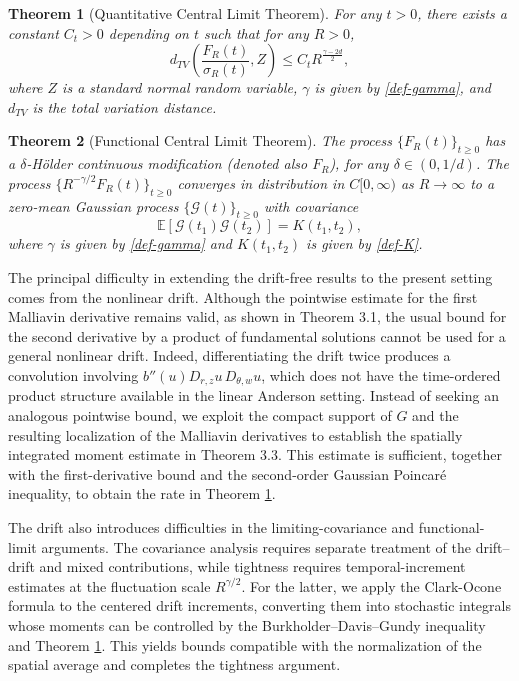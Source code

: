 \documentclass[12pt]{article}
\newtheorem{theorem}{Theorem}[section]
\def\cG{\mathcal{G}}
\def\bE{\mathbb{E}}
\def\bR{\mathbb{R}}
\begin{document}
\begin{theorem}[Quantitative Central Limit Theorem]
\label{QCLT}
For any $t>0$, there exists a constant $C_t>0$ depending on $t$ such that for any $R>0$,
\[
d_{TV}\left( \frac{F_R(t)}{\sigma_R(t)},Z\right) \leq C_t R^{\frac{\gamma-2d}{2}},
\]
where $Z$ is a standard normal random variable, $\gamma$ is given by \eqref{def-gamma}, and $d_{TV}$ is the total variation distance.
\end{theorem}


\begin{theorem}[Functional Central Limit Theorem]
\label{FCLT}
The process $\{F_R(t)\}_{t\geq 0}$ has a $\delta$-H\"older continuous modification (denoted also $F_R$), for any $\delta \in (0,1/d)$. The process $\{R^{-\gamma/2} F_R(t)\}_{t\geq 0}$ converges in distribution in $C[0,\infty)$ as $R \to \infty$ to a zero-mean Gaussian process $\{\cG(t)\}_{t\geq 0}$ with covariance 
\[
\bE[\cG(t_1) \cG(t_2)]=K(t_1,t_2),
\]
where $\gamma$ is given by \eqref{def-gamma} and $K(t_1,t_2)$ is given by \eqref{def-K}.
\end{theorem}

The principal difficulty in extending the drift-free results to the present setting comes from the nonlinear drift. Although the pointwise estimate for the first Malliavin derivative remains valid, as shown in Theorem 3.1, the usual bound for the second derivative by a product of fundamental solutions cannot be used for a general nonlinear drift. Indeed, differentiating the drift twice produces a convolution involving $b''(u)D_{r,z}u\,D_{\theta,w}u$, which does not have the time-ordered product structure available in the linear Anderson setting. Instead of seeking an analogous pointwise bound, we exploit the compact support of $G$ and the resulting localization of the Malliavin derivatives to establish the spatially integrated moment estimate in Theorem 3.3. This estimate is sufficient, together with the first-derivative bound and the second-order Gaussian Poincar\'e inequality, to obtain the rate in Theorem \ref{QCLT}.

The drift also introduces difficulties in the limiting-covariance and functional-limit arguments. The covariance analysis requires separate treatment of the drift–drift and mixed contributions, while tightness requires temporal-increment estimates at the fluctuation scale $R^{\gamma/2}$. For the latter, we apply the Clark-Ocone formula to the centered drift increments, converting them into stochastic integrals whose moments can be controlled by the Burkholder–Davis–Gundy inequality and Theorem \ref{QCLT}. This yields bounds compatible with the normalization of the spatial average and completes the tightness argument.
\end{document}
